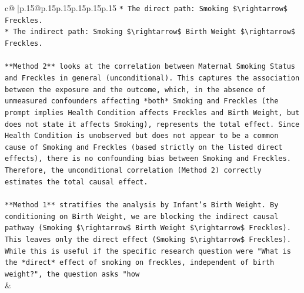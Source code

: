 \documentclass{article}
\begin{document}
{\begin{supertabular}{c@{$\;$}|p{.15\linewidth}@{}p{.15\linewidth}p{.15\linewidth}p{.15\linewidth}p{.15\linewidth}p{.15\linewidth}}
{{{\texttt{*   The direct path: Smoking \$\textbackslash{}rightarrow\$ Freckles.} \\
\texttt{*   The indirect path: Smoking \$\textbackslash{}rightarrow\$ Birth Weight \$\textbackslash{}rightarrow\$ Freckles.} \\
\\ 
\texttt{**Method 2** looks at the correlation between Maternal Smoking Status and Freckles in general (unconditional). This captures the association between the exposure and the outcome, which, in the absence of unmeasured confounders affecting *both* Smoking and Freckles (the prompt implies Health Condition affects Freckles and Birth Weight, but does not state it affects Smoking), represents the total effect. Since Health Condition is unobserved but does not appear to be a common cause of Smoking and Freckles (based strictly on the listed direct effects), there is no confounding bias between Smoking and Freckles. Therefore, the unconditional correlation (Method 2) correctly estimates the total causal effect.} \\
\\ 
\texttt{**Method 1** stratifies the analysis by Infant's Birth Weight. By conditioning on Birth Weight, we are blocking the indirect causal pathway (Smoking \$\textbackslash{}rightarrow\$ Birth Weight \$\textbackslash{}rightarrow\$ Freckles). This leaves only the direct effect (Smoking \$\textbackslash{}rightarrow\$ Freckles). While this is useful if the specific research question were "What is the *direct* effect of smoking on freckles, independent of birth weight?", the question asks "how} \\
            }
        }
    }
    & \\ \\


\end{supertabular}}
\end{document}
